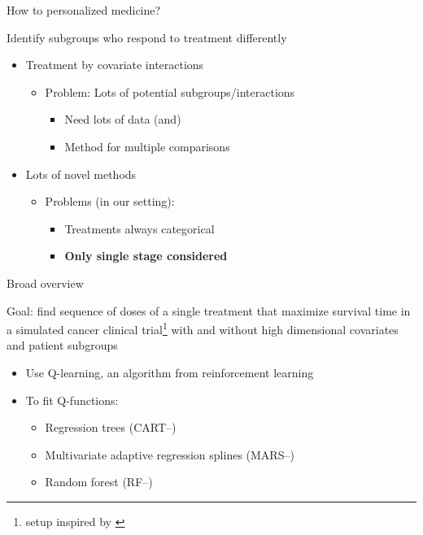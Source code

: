 \documentclass{beamer}
\begin{document}
\begin{frame}[c]{How to personalized medicine?}

Identify subgroups who respond to treatment differently
\begin{itemize}[<+(1)->]
  \item Treatment by covariate interactions
  \begin{itemize}
    \item Problem: Lots of potential subgroups/interactions
    \begin{itemize}
      \item Need lots of data (and)
      \item Method for multiple comparisons
    \end{itemize}
  \end{itemize}
  \item Lots of novel methods
  \begin{itemize}
    \item Problems (in our setting): 
    \begin{itemize}
      \item Treatments always categorical
      \item \textbf{Only single stage considered}
    \end{itemize}
  \end{itemize}
\end{itemize}

\end{frame}


\begin{frame}[c]{Broad overview}

Goal: find sequence of doses of a single treatment that maximize survival time in a simulated cancer clinical trial\footnote{setup inspired by \textcite{crt}} with and without high dimensional covariates and patient subgroups
\begin{itemize}[<+(1)->]
    \item Use Q-learning, an algorithm from reinforcement learning
    \item To fit Q-functions: 
    \begin{itemize}[<+->]
      \item Regression trees (CART--\cite{CART})
      \item Multivariate adaptive regression splines (MARS--\cite{mars})
      \item Random forest (RF--\cite{rf})
    \end{itemize} 
\end{itemize}

\end{frame}
\end{document}
